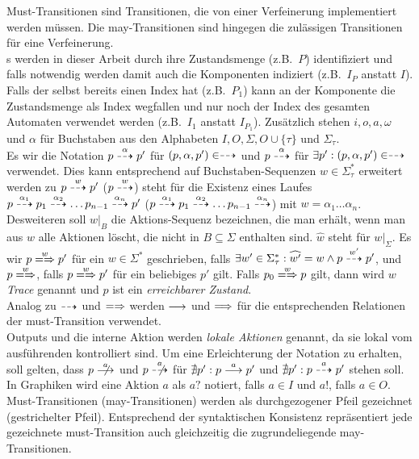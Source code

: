 Must-Transitionen sind Transitionen, die von einer Verfeinerung implementiert
werden müssen. Die may-Transitionen sind hingegen die zulässigen Transitionen
für eine Verfeinerung.\\
\MEIO{}s  werden in dieser Arbeit durch ihre Zustandsmenge (z.B.\ $P$)
identifiziert und falls notwendig werden damit auch die Komponenten indiziert
(z.B.\ $I_P$ anstatt $I$). Falls der \MEIO{} selbst bereits einen Index hat
(z.B.\ $P_1$) kann an der Komponente die Zustandsmenge als Index wegfallen und
nur noch der Index des gesamten Automaten verwendet werden (z.B.\ $I_1$ anstatt
$I_{P_1}$). Zusätzlich stehen $i,o,a,\omega$ und $\alpha$ für Buchstaben aus
den Alphabeten $I,O,\Sigma ,O\cup\{\tau\}$ und $\Sigma_\tau$.\\
Es wir die Notation $p\may[\alpha] p'$ für $(p,\alpha,p')\in\may$ und
$p\may[\alpha]$ für $\exists p':(p,\alpha,p')\in\may$ verwendet. Dies kann
entsprechend auf Buchstaben-Sequenzen $w\in\Sigma_{\tau}^*$ erweitert werden zu
$p\may[w]p'$ ($p\may[w]$) steht für die Existenz eines Laufes $p\may[\alpha _1]
p_1\may[\alpha _2]\dots p_{n-1}\may[\alpha _n] p'$ ($p\may[\alpha _1]
p_1\may[\alpha _2]\dots p_{n-1}\may[\alpha _n]$) mit $w=\alpha _1\dots \alpha
_n$.\\
Desweiteren soll $w|_B$ die Aktions-Sequenz bezeichnen, die man erhält, wenn
man aus $w$ alle Aktionen löscht, die nicht in $B\subseteq\Sigma$ enthalten
sind. $\widehat{w}$ steht für $w|_{\Sigma}$. Es wir $p\weakmay[w] p'$
für ein $w\in\Sigma ^*$ geschrieben, falls $\exists
w'\in\Sigma_{\tau}^*:\widehat{w'}=w\land p\may[w']p'$, und $p\weakmay[w]$,
falls $p\weakmay[w] p'$ für ein beliebiges $p'$ gilt. Falls $p_0\weakmay[w] p$
gilt, dann wird $w$ \emph{Trace} genannt und $p$ ist ein \emph{erreichbarer
Zustand}.\\
Analog zu $\may$ und $\weakmay$ werden $\must$ und $\weakmust$ für die
entsprechenden Relationen der must-Transition verwendet.\\
Outputs und die interne Aktion werden \emph{lokale Aktionen} genannt, da sie
lokal vom ausführenden \MEIO{} kontrolliert sind. Um eine Erleichterung der
Notation zu erhalten, soll gelten, dass $p\nmust[a]$ und $p\nmay[a]$ für
$\nexists p': p\must[a]p'$ und $\nexists p': p\may[a]p'$ stehen soll. In
Graphiken wird eine Aktion $a$ als $a?$ notiert, falls $a\in I$ und $a!$, falls
$a\in O$. Must-Transitionen (may-Transitionen) werden als durchgezogener Pfeil
gezeichnet (gestrichelter Pfeil). Entsprechend der syntaktischen Konsistenz
repräsentiert jede gezeichnete must-Transition auch gleichzeitig die
zugrundeliegende may-Transitionen.

